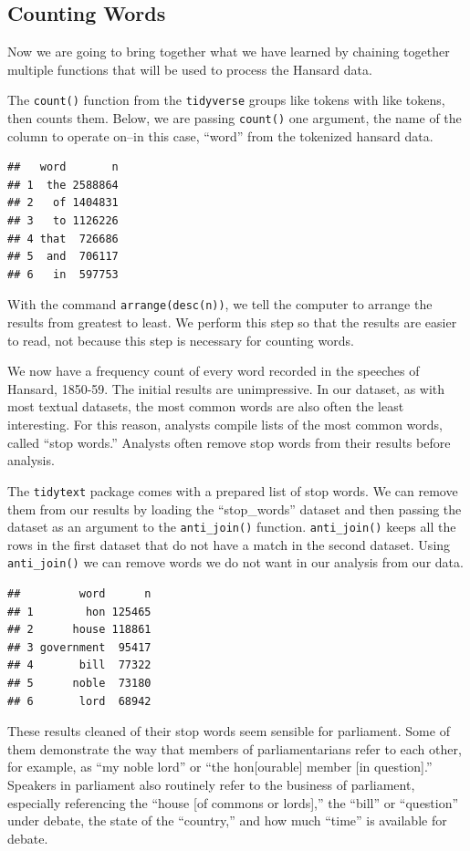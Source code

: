 \documentclass[
]{article}
\begin{document}
\subsection{Counting Words}\label{counting-words}

Now we are going to bring together what we have learned by chaining
together multiple functions that will be used to process the Hansard
data.

The \texttt{count()} function from the \texttt{tidyverse} groups like
tokens with like tokens, then counts them. Below, we are passing
\texttt{count()} one argument, the name of the column to operate on--in
this case, ``word'' from the tokenized hansard data.

\begin{verbatim}
##   word       n
## 1  the 2588864
## 2   of 1404831
## 3   to 1126226
## 4 that  726686
## 5  and  706117
## 6   in  597753
\end{verbatim}

With the command \texttt{arrange(desc(n))}, we tell the computer to
arrange the results from greatest to least. We perform this step so that
the results are easier to read, not because this step is necessary for
counting words.

We now have a frequency count of every word recorded in the speeches of
Hansard, 1850-59. The initial results are unimpressive. In our dataset,
as with most textual datasets, the most common words are also often the
least interesting. For this reason, analysts compile lists of the most
common words, called ``stop words.'' Analysts often remove stop words
from their results before analysis.

The \texttt{tidytext} package comes with a prepared list of stop words.
We can remove them from our results by loading the ``stop\_words''
dataset and then passing the dataset as an argument to the
\texttt{anti\_join()} function. \texttt{anti\_join()} keeps all the rows
in the first dataset that do not have a match in the second dataset.
Using \texttt{anti\_join()} we can remove words we do not want in our
analysis from our data.

\begin{verbatim}
##         word      n
## 1        hon 125465
## 2      house 118861
## 3 government  95417
## 4       bill  77322
## 5      noble  73180
## 6       lord  68942
\end{verbatim}

These results cleaned of their stop words seem sensible for parliament.
Some of them demonstrate the way that members of parliamentarians refer
to each other, for example, as ``my noble lord'' or ``the
hon{[}ourable{]} member {[}in question{]}.'' Speakers in parliament also
routinely refer to the business of parliament, especially referencing
the ``house {[}of commons or lords{]},'' the ``bill'' or ``question''
under debate, the state of the ``country,'' and how much ``time'' is
available for debate.
\end{document}
